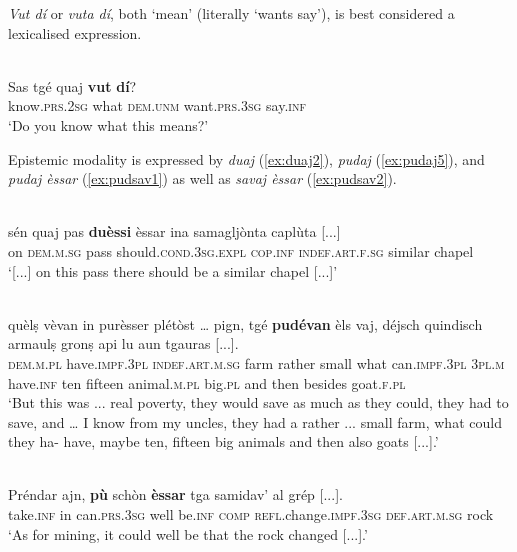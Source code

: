 \textit{Vut dí} or \textit{vuta dí}, both `mean'  (literally `wants say'), is best considered a lexicalised expression.

\ea
\label{ex:vutdi1}
\\
\gll Sas tgé quaj \textbf{vut} \textbf{dí}?   \\
know.\textsc{prs.2sg} what \textsc{dem.unm} want.\textsc{prs.3sg} say.\textsc{inf}\\
\glt `Do you know what this means?'
\z

Epistemic modality is expressed by \textit{duaj}  (\ref{ex:duaj2}), \textit{pudaj} (\ref{ex:pudaj5}), and \textit{pudaj èssar} (\ref{ex:pudsav1}) as well as \textit{savaj èssar} (\ref{ex:pudsav2}).

\ea
\label{ex:duaj2}
\\
\gll   [...] sén quaj pas \textbf{duèssi} èssar ina samagljònta caplùta [...] \\
{} on \textsc{dem.m.sg} pass should.\textsc{cond.3sg.expl} \textsc{cop.inf} \textsc{indef.art.f.sg} similar chapel\\
\glt `[...] on this pass there should be a similar chapel [...]'
\z

\ea
\label{ex:pudaj5}
\\
\gll   [...] quèlṣ vèvan in purèsser plétòst … pign, tgé \textbf{pudévan} èls vaj, déjsch quindisch armaulṣ gronṣ api lu aun tgauras [...]. \\
{} \textsc{dem.m.pl} have.\textsc{impf.3pl} \textsc{indef.art.m.sg} farm rather {} small what can.\textsc{impf.3pl} \textsc{3pl.m} have.\textsc{inf} ten fifteen animal.\textsc{m.pl} big.\textsc{pl} and then besides goat.\textsc{f.pl}\\
\glt `But this was ... real poverty, they would save as much as they  could, they had to save, and … I know from my uncles, they had a rather ... small farm, what could they ha- have, maybe ten, fifteen big animals and then also goats [...].'
\z

\ea
\label{ex:pudsav1}
\\
\gll Préndar ajn, \textbf{pù} schòn \textbf{èssar} tga samidav’ al grép [...].\\
take.\textsc{inf} in can.\textsc{prs.3sg} well be.\textsc{inf}  \textsc{comp} \textsc{refl}.change.\textsc{impf.3sg} \textsc{def.art.m.sg} rock\\
\glt `As for mining, it could well be that the rock changed [...].'
\z

